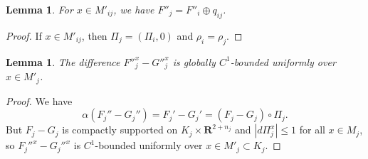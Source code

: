 \documentclass[reqno]{amsart}
\theoremstyle{theorem}
\newtheorem{lemma}[corollary]{Lemma}
\theoremstyle{remark}
\theoremstyle{definition}
\newcommand{\R}{\mathbf{R}}
\begin{document}
\begin{lemma}
For $x\in M'_{ij}$, we have $F''_j=F''_i \oplus  q_{ij}$.
\end{lemma}
\begin{proof}
If $x\in M'_{ij}$, then $\Pi_j=(\Pi_i,0)$ and $\rho_i=\rho_j$. 
\end{proof}


\begin{lemma}\label{lem:C1bound}
The difference $F''^x_j-G''^x_j$ is globally $C^1$-bounded uniformly over $x\in M'_j$.
\end{lemma}
\begin{proof}
We have
\[\alpha(F_j''-G_j'')=F_j'-G_j'=(F_j-G_j)\circ \Pi_j.\]
But $F_j-G_j$ is compactly supported on $K_j\times \R^{2+n_j}$ and $|d\Pi_j^x|\leq 1$ for all $x\in M_j$,
so $F_j''^x-G_j''^x$ is $C^1$-bounded uniformly over $x\in M'_j \subset K_j$.
\end{proof}
\end{document}
